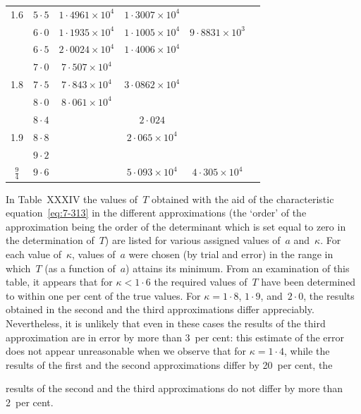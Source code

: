 \begin{table}[ht]
\begin{tabular}{cccccc}
1.6 & $5{\cdot}5$ & $1{\cdot}4961\times10^4$ & $1{\cdot}3007\times10^4$ & \\
    & $6{\cdot}0$ & $1{\cdot}1935\times10^4$ & $1{\cdot}1005\times10^4$ & $9{\cdot}8831\times10^3$ \\
    & $6{\cdot}5$ & $2{\cdot}0024\times10^4$ & $1{\cdot}4006\times10^4$ & \\
\hline
    & $7{\cdot}0$ & $7{\cdot}507\times10^4$ & & \\
1.8 & $7{\cdot}5$ & $7{\cdot}843\times10^4$ & $3{\cdot}0862\times10^4$ & \\
    & $8{\cdot}0$ & $8{\cdot}061\times10^4$ & & \\
\hline
    & $8{\cdot}4$ & & $2{\cdot}024$ & \\
1.9 & $8{\cdot}8$ & & $2{\cdot}065\times10^4$ & \\
    & $9{\cdot}2$ & & & \\
\hline
$\frac{9}{4}$ & $9{\cdot}6$ & & $5{\cdot}093\times10^4$ & $4{\cdot}305\times10^4$ \\
\hline
\end{tabular}
\end{table}

In Table~XXXIV the values of~$T$ obtained with the aid of the characteristic equation~\eqref{eq:7-313} in the different approximations (the `order' of the
approximation being the order of the determinant which is set equal
to zero in the determination of~$T$) are listed for various assigned values
of~$a$ and~$\kappa$.  For each value of~$\kappa$, values of~$a$ were chosen (by trial and
error) in the range in which~$T$ (as a function of~$a$) attains its minimum.
From an examination of this table, it appears that for $\kappa < 1{\cdot}6$ the
required values of~$T$ have been determined to within one per cent of the
true values.  For $\kappa = 1{\cdot}8$, $1{\cdot}9$, and~$2{\cdot}0$, the results obtained in the second
and the third approximations differ appreciably.  Nevertheless, it is
unlikely that even in these cases the results of the third approximation
are in error by more than 3~per cent: this estimate of the error does not
appear unreasonable when we observe that for $\kappa = 1{\cdot}4$, while the results
of the first and the second approximations differ by 20~per cent, the


results of the second and the third approximations do not differ by more
than 2~per cent.


